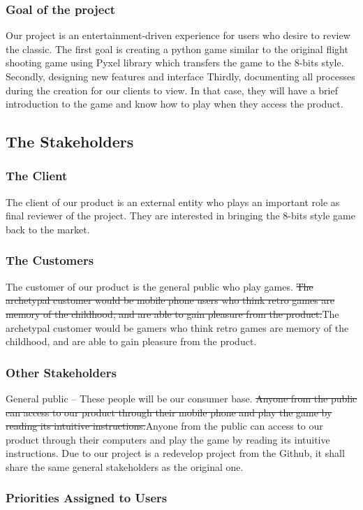 \documentclass[12pt, titlepage]{article}
\begin{document}
\subsubsection{Goal of the project}
Our project is an entertainment-driven experience for users who desire to review the classic. The first goal is creating a python game similar to the original flight shooting game using Pyxel library which transfers the game to the 8-bits style. {\color{red}Secondly, designing new features and interface }Thirdly, documenting all processes during the creation for our clients to view. In that case, they will have a brief introduction to the game and know how to play when they access the product.
\subsection{The Stakeholders}
\subsubsection{The Client}
The client of our product is an external entity who plays an important role as final reviewer of the project. They are interested in bringing the 8-bits style game back to the market.\\
\subsubsection{The Customers}
The customer of our product is the general public who play games. \sout{The archetypal customer would be mobile phone users who think retro games are memory of the childhood, and are able to gain pleasure from the product.}{\color{red}The archetypal customer would be gamers who think retro games are memory of the childhood, and are able to gain pleasure from the product.}
\subsubsection{Other Stakeholders}
General public -- These people will be our consumer base. \sout{Anyone from the public can access to our product through their mobile phone and play the game by reading its intuitive instructions.}{\color{red}Anyone from the public can access to our product through their computers and play the game by reading its intuitive instructions.} Due to our project is a redevelop project from the Github, it shall share the same general stakeholders as the original one.
\subsubsection{Priorities Assigned to Users}
\end{document}
